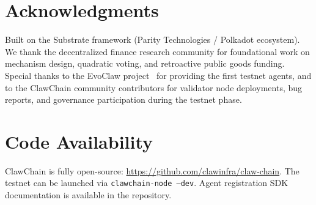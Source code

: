 \documentclass[conference]{IEEEtran}
\begin{document}
\section*{Acknowledgments}

Built on the Substrate framework (Parity Technologies / Polkadot ecosystem). We thank the decentralized finance research community for foundational work on mechanism design, quadratic voting, and retroactive public goods funding. Special thanks to the EvoClaw project~\cite{chen2025evoclaw} for providing the first testnet agents, and to the ClawChain community contributors for validator node deployments, bug reports, and governance participation during the testnet phase.

\section*{Code Availability}

ClawChain is fully open-source: \url{https://github.com/clawinfra/claw-chain}. The testnet can be launched via \texttt{clawchain-node --dev}. Agent registration SDK documentation is available in the repository.

\end{document}
